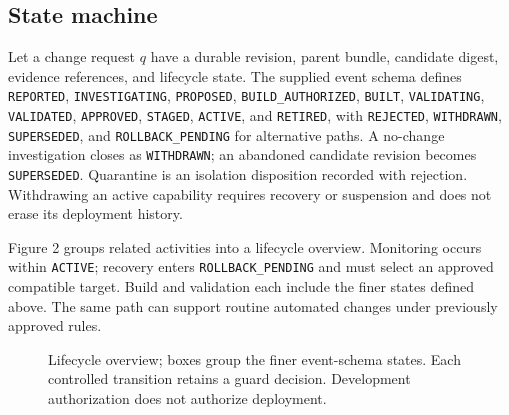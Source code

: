 \documentclass[preprint,12pt,authoryear]{elsarticle}
\begin{document}
\subsection{State machine}\label{state-machine}

Let a change request \(q\) have a durable revision, parent bundle,
candidate digest, evidence references, and lifecycle state. The supplied
event schema defines \texttt{REPORTED}, \texttt{INVESTIGATING},
\texttt{PROPOSED}, \texttt{BUILD\_AUTHORIZED}, \texttt{BUILT},
\texttt{VALIDATING}, \texttt{VALIDATED}, \texttt{APPROVED},
\texttt{STAGED}, \texttt{ACTIVE}, and \texttt{RETIRED}, with
\texttt{REJECTED}, \texttt{WITHDRAWN}, \texttt{SUPERSEDED}, and
\texttt{ROLLBACK\_PENDING} for alternative paths. A no-change
investigation closes as \texttt{WITHDRAWN}; an abandoned candidate
revision becomes \texttt{SUPERSEDED}. Quarantine is an isolation
disposition recorded with rejection. Withdrawing an active capability
requires recovery or suspension and does not erase its deployment
history.

Figure 2 groups related activities into a lifecycle overview. Monitoring
occurs within \texttt{ACTIVE}; recovery enters
\texttt{ROLLBACK\_PENDING} and must select an approved compatible
target. Build and validation each include the finer states defined
above. The same path can support routine automated changes under
previously approved rules.

\begin{figure}[htbp]
\centering




\caption{Lifecycle overview; boxes group the finer event-schema states. Each
controlled transition retains a guard decision. Development
authorization does not authorize deployment.}
\end{figure}
\end{document}
